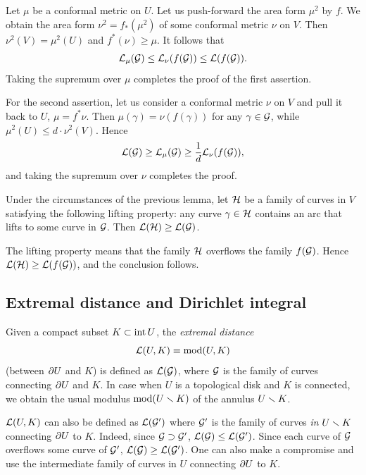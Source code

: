 \begin{pf}
  Let $\mu$ be a conformal metric on $U$. %
Let us push-forward the area form   $\mu^2$  by  $f$. 
We obtain the area form $\nu^2= f_*(\mu^2)$  of some conformal metric $\nu$ on $V$.   
Then $\nu^2 (V) = \mu^2 (U)$ and $f^* (\nu) \geq \mu$. It follows that
$$
    {\cal L}_\mu({\cal G}) \leq  {\cal L}_\nu(f({\cal G})) \leq  {\cal L}(f({\cal G})) .
$$ 
Taking the supremum over $\mu$ completes the proof of the first assertion. 

\ssk 
  For the second assertion,
let us consider a conformal metric $\nu$ on $V$ and pull it back to $U$, $\mu= f^* \nu$.
Then $\mu(\gamma) = \nu(f(\gamma))$ for any $\gamma\in {\cal G}$, while $\mu^2(U) \leq d\cdot \nu^2(V)$. 
Hence 
$$
   {\cal L}({\cal G})\geq {\cal L}_\mu({\cal G}) \geq \frac {1}{d} {\cal L}_\nu(f({\cal G})),
$$
and taking the supremum over $\nu$ completes the proof. 
\end{pf}

\begin{cor}\label{two families}
     Under the circumstances of the previous lemma, 
let ${\cal H}$ be a family of curves in $V$ satisfying the following lifting
property: any curve $\gamma\in {\cal H}$ contains an arc that lifts to some curve
in ${\cal G}$. Then ${\cal L}({\cal H})\geq {\cal L}({\cal G})$.
\end{cor}

\begin{pf}
   The lifting property means that the family ${\cal H}$ 
overflows the family $f({\cal G})$. Hence ${\cal L}({\cal H})\geq {\cal L}(f({\cal G}))$,
and the conclusion follows.
\end{pf}


 
\subsection{Extremal distance and Dirichlet integral}

 Given a compact subset $K\subset \operatorname{int} U$, the {\it extremal distance} 
               $${\cal L}(U, K)\equiv \operatorname{mod} (U,K)$$
(between $\partial U$ and $K$) is defined as ${\cal L}({\cal G})$, where ${\cal G}$ is the family of curves 
connecting $\partial U$ and $K$. In case when $U$ is a topological disk and $K$ is connected,
we obtain the usual modulus $\operatorname{mod}(U\smallsetminus K)$ of the annulus $U\smallsetminus K$. 

 ${\cal L}(U,K)$ can also be defined as ${\cal L}({\cal G}')$ where ${\cal G}'$ is the family of curves 
{\it in} $U\smallsetminus K$ connecting $\partial U$ to $K$. Indeed, since ${\cal G}\supset {\cal G}'$, ${\cal L}({\cal G})\leq {\cal L}({\cal G}')$.
Since each curve of ${\cal G}$ overflows some curve of ${\cal G}'$, ${\cal L}({\cal G})\geq {\cal L}({\cal G}')$. 
One can also make a compromise and use the intermediate  family of curves in $U$ connecting $\partial U$ to $K$. 
\ssk

